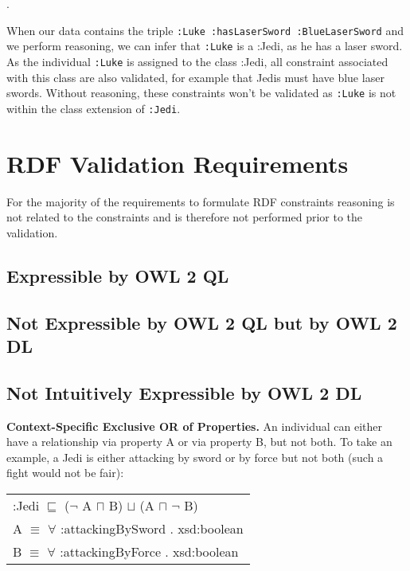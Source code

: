 \documentclass{llncs}
\newcommand{\ms}[1]{\texttt{#1}}
\newenvironment{DL}{
  \scriptsize
  \sffamily
  \vspace{0.3cm}
  \begin{tabular}{l}

}{
  \end{tabular}
  \linebreak
}
\begin{document}
\begin{ex}
 .
\end{ex}

When our data contains the triple \ms{:Luke :hasLaserSword :BlueLaserSword} and we perform reasoning, we can infer that \ms{:Luke} is a :Jedi, as he has a laser sword.
As the individual \ms{:Luke} is assigned to the class :Jedi, all constraint associated with this class are also validated, for example that Jedis must have blue laser swords.
Without reasoning, these constraints won't be validated as \ms{:Luke} is not within the class extension of \ms{:Jedi}.

\section{RDF Validation Requirements}

For the majority of the requirements to formulate RDF constraints reasoning is not related to the constraints and is therefore not performed prior to the validation.

\subsection{Expressible by OWL 2 QL}

\subsection{Not Expressible by OWL 2 QL but by OWL 2 DL}

\subsection{Not Intuitively Expressible by OWL 2 DL}

\textbf{Context-Specific Exclusive OR of Properties.}
An individual can either have a relationship via property A or via property B, but not both.
To take an example, a Jedi is either attacking by sword or by force but not both (such a fight would not be fair):

\begin{DL}
:Jedi $\sqsubseteq$ ($\neg$ A $\sqcap$ B) $\sqcup$ (A $\sqcap$ $\neg$ B) \\
A $\equiv$ $\forall$ :attackingBySword . xsd:boolean \\
B $\equiv$ $\forall$ :attackingByForce . xsd:boolean \\ 
\end{DL}
\end{document}
